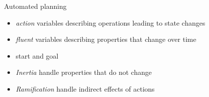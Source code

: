 \begin{frame}{Automated planning}
  \begin{itemize}
  \item \emph{action} variables describing operations leading to state changes
  \item \emph{fluent} variables describing properties that change over time
  \item start and goal
  \item \emph{Inertia} handle properties that do not change
  \item \emph{Ramification} handle indirect effects of actions
  \end{itemize}
\end{frame}
%
